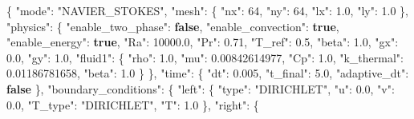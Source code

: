 \documentclass[
  10pt,
]{article}
\newenvironment{Shaded}{}{}
\newcommand{\DataTypeTok}[1]{\textcolor[rgb]{0.56,0.13,0.00}{#1}}
\newcommand{\DecValTok}[1]{\textcolor[rgb]{0.25,0.63,0.44}{#1}}
\newcommand{\FloatTok}[1]{\textcolor[rgb]{0.25,0.63,0.44}{#1}}
\newcommand{\FunctionTok}[1]{\textcolor[rgb]{0.02,0.16,0.49}{#1}}
\newcommand{\KeywordTok}[1]{\textcolor[rgb]{0.00,0.44,0.13}{\textbf{#1}}}
\newcommand{\StringTok}[1]{\textcolor[rgb]{0.25,0.44,0.63}{#1}}
\begin{document}
\begin{Shaded}
\begin{Highlighting}[]
\FunctionTok{\{}
  \DataTypeTok{"mode"}\FunctionTok{:} \StringTok{"NAVIER\_STOKES"}\FunctionTok{,}
  \DataTypeTok{"mesh"}\FunctionTok{:} \FunctionTok{\{}
    \DataTypeTok{"nx"}\FunctionTok{:} \DecValTok{64}\FunctionTok{,}
    \DataTypeTok{"ny"}\FunctionTok{:} \DecValTok{64}\FunctionTok{,}
    \DataTypeTok{"lx"}\FunctionTok{:} \FloatTok{1.0}\FunctionTok{,}
    \DataTypeTok{"ly"}\FunctionTok{:} \FloatTok{1.0}
  \FunctionTok{\},}
  \DataTypeTok{"physics"}\FunctionTok{:} \FunctionTok{\{}
    \DataTypeTok{"enable\_two\_phase"}\FunctionTok{:} \KeywordTok{false}\FunctionTok{,}
    \DataTypeTok{"enable\_convection"}\FunctionTok{:} \KeywordTok{true}\FunctionTok{,}
    \DataTypeTok{"enable\_energy"}\FunctionTok{:} \KeywordTok{true}\FunctionTok{,}
    \DataTypeTok{"Ra"}\FunctionTok{:} \FloatTok{10000.0}\FunctionTok{,}
    \DataTypeTok{"Pr"}\FunctionTok{:} \FloatTok{0.71}\FunctionTok{,}
    \DataTypeTok{"T\_ref"}\FunctionTok{:} \FloatTok{0.5}\FunctionTok{,}
    \DataTypeTok{"beta"}\FunctionTok{:} \FloatTok{1.0}\FunctionTok{,}
    \DataTypeTok{"gx"}\FunctionTok{:} \FloatTok{0.0}\FunctionTok{,}
    \DataTypeTok{"gy"}\FunctionTok{:} \FloatTok{1.0}\FunctionTok{,}
    \DataTypeTok{"fluid1"}\FunctionTok{:} \FunctionTok{\{}
      \DataTypeTok{"rho"}\FunctionTok{:} \FloatTok{1.0}\FunctionTok{,}
      \DataTypeTok{"mu"}\FunctionTok{:} \FloatTok{0.00842614977}\FunctionTok{,}
      \DataTypeTok{"Cp"}\FunctionTok{:} \FloatTok{1.0}\FunctionTok{,}
      \DataTypeTok{"k\_thermal"}\FunctionTok{:} \FloatTok{0.01186781658}\FunctionTok{,}
      \DataTypeTok{"beta"}\FunctionTok{:} \FloatTok{1.0}
    \FunctionTok{\}}
  \FunctionTok{\},}
  \DataTypeTok{"time"}\FunctionTok{:} \FunctionTok{\{}
    \DataTypeTok{"dt"}\FunctionTok{:} \FloatTok{0.005}\FunctionTok{,}
    \DataTypeTok{"t\_final"}\FunctionTok{:} \FloatTok{5.0}\FunctionTok{,}
    \DataTypeTok{"adaptive\_dt"}\FunctionTok{:} \KeywordTok{false}
  \FunctionTok{\},}
  \DataTypeTok{"boundary\_conditions"}\FunctionTok{:} \FunctionTok{\{}
    \DataTypeTok{"left"}\FunctionTok{:} \FunctionTok{\{}
      \DataTypeTok{"type"}\FunctionTok{:} \StringTok{"DIRICHLET"}\FunctionTok{,}
      \DataTypeTok{"u"}\FunctionTok{:} \FloatTok{0.0}\FunctionTok{,}
      \DataTypeTok{"v"}\FunctionTok{:} \FloatTok{0.0}\FunctionTok{,}
      \DataTypeTok{"T\_type"}\FunctionTok{:} \StringTok{"DIRICHLET"}\FunctionTok{,}
      \DataTypeTok{"T"}\FunctionTok{:} \FloatTok{1.0}
    \FunctionTok{\},}
    \DataTypeTok{"right"}\FunctionTok{:} \FunctionTok{\{}

\end{Highlighting}
\end{Shaded}
\end{document}
